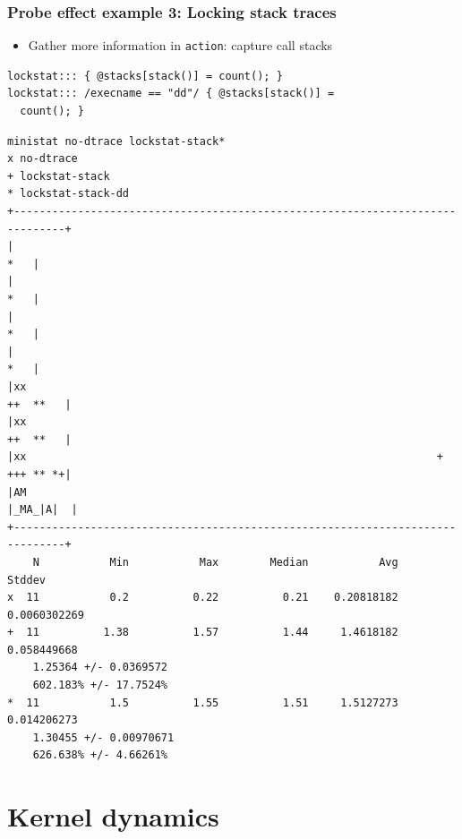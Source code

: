 \begin{frame}[fragile]
  \frametitle{Probe effect example 3: Locking stack traces}

  \begin{itemize}
    \item Gather more information in \texttt{action}: capture call stacks
  \end{itemize}

  \begin{small}
    \begin{verbatim}
lockstat::: { @stacks[stack()] = count(); }
lockstat::: /execname == "dd"/ { @stacks[stack()] =
  count(); }
\end{verbatim}
  \end{small}

  \pause

  \begin{center}
    \begin{tiny}
      \begin{verbatim}
ministat no-dtrace lockstat-stack*
x no-dtrace
+ lockstat-stack
* lockstat-stack-dd
+------------------------------------------------------------------------------+
|                                                                          *   |
|                                                                          *   |
|                                                                          *   |
|                                                                          *   |
|xx                                                                   ++  **   |
|xx                                                                   ++  **   |
|xx                                                                +  +++ ** *+|
|AM                                                                  |_MA_|A|  |
+------------------------------------------------------------------------------+
    N           Min           Max        Median           Avg        Stddev
x  11           0.2          0.22          0.21    0.20818182  0.0060302269
+  11          1.38          1.57          1.44     1.4618182   0.058449668
	1.25364 +/- 0.0369572
	602.183% +/- 17.7524%
*  11           1.5          1.55          1.51     1.5127273   0.014206273
	1.30455 +/- 0.00970671
	626.638% +/- 4.66261%
\end{verbatim}
    \end{tiny}
  \end{center}
\end{frame}

\section{Kernel dynamics}

